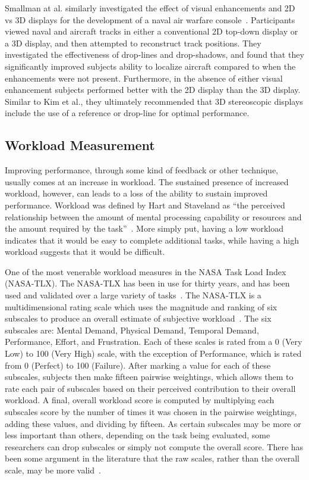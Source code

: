 \documentclass[float=false, crop=false]{standalone}
\begin{document}
Smallman at al. similarly investigated the effect of visual enhancements and 2D vs 3D displays for the development of a naval air warfare console~\cite{Smallman2000}.
Participants viewed naval and aircraft tracks in either a conventional 2D top-down display or a 3D display, and then attempted to reconstruct track positions.
They investigated the effectiveness of drop-lines and drop-shadows, and found that they significantly improved subjects ability to localize aircraft compared to when the enhancements were not present.
Furthermore, in the absence of either visual enhancement subjects performed better with the 2D display than the 3D display.
Similar to Kim et al., they ultimately recommended that 3D stereoscopic displays include the use of a reference or drop-line for optimal performance.

\subsection{Workload Measurement}
Improving performance, through some kind of feedback or other technique, usually comes at an increase in workload.
The sustained presence of increased workload, however, can leads to a loss of the ability to sustain improved performance.
Workload was defined by Hart and Staveland as ``the perceived relationship between the amount of mental processing capability or resources and the amount required by the task''~\cite{Hart1988}.
More simply put, having a low workload indicates that it would be easy to complete additional tasks, while having a high workload suggests that it would be difficult.

One of the most venerable workload measures in the NASA Task Load Index (NASA-TLX).
The NASA-TLX has been in use for thirty years, and has been used and validated over a large variety of tasks~\cite{Hart2006}.
The NASA-TLX is a multidimensional rating scale which uses the magnitude and ranking of six subscales to produce an overall estimate of subjective workload~\cite{Hart1988}.
The six subscales are: Mental Demand, Physical Demand, Temporal Demand, Performance, Effort, and Frustration.
Each of these scales is rated from a 0 (Very Low) to 100 (Very High) scale, with the exception of Performance, which is rated from 0 (Perfect) to 100 (Failure).
After marking a value for each of these subscales, subjects then make fifteen pairwise weightings, which allows them to rate each pair of subscales based on their perceived contribution to their overall workload.
A final, overall workload score is computed by multiplying each subscales score by the number of times it was chosen in the pairwise weightings, adding these values, and dividing by fifteen.
As certain subscales may be more or less important than others, depending on the task being evaluated, some researchers can drop subscales or simply not compute the overall score.
There has been some argument in the literature that the raw scales, rather than the overall scale, may be more valid~\cite{bustamante2008measurement}.
\end{document}
